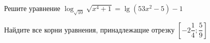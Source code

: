 \begin{ex}
	\begin{condition}
		\begin{enumcols}[label=\asbuk*)]
			\item Решите уравнение \( \log_{\sqrt{10}} \sqrt{x^4 + 1} = \lg (53x^2 - 5) - 1 \)
			\item Найдите все корни уравнения, принадлежащие отрезку \( \left[-2\dfrac{1}{4};\dfrac{5}{9}\right] \)
		\end{enumcols}
	\end{condition}
\end{ex}
